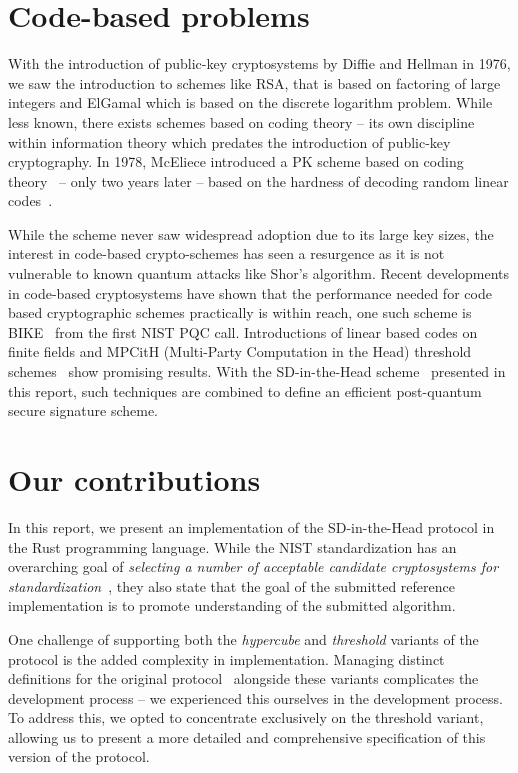 \documentclass[11pt]{report}
\theoremstyle{definition}
\theoremstyle{plain}
\begin{document}
\section{Code-based problems}

With the introduction of public-key cryptosystems by Diffie and Hellman in 1976, we saw the introduction to schemes like RSA, that is based on factoring of large integers and ElGamal which is based on the discrete logarithm problem. While less known, there exists schemes based on coding theory -- its own discipline within information theory which predates the introduction of public-key cryptography. In 1978, McEliece introduced a PK scheme based on coding theory~\cite{mceliece1978public} -- only two years later -- based on the hardness of decoding random linear codes~\cite{berlekamp1978inherent}.

While the scheme never saw widespread adoption due to its large key sizes, the interest in code-based crypto-schemes has seen a resurgence as it is not vulnerable to known quantum attacks like Shor's algorithm. Recent developments in code-based cryptosystems have shown that the performance needed for code based cryptographic schemes practically is within reach, one such scheme is BIKE~\cite{BIKE_Spec_2024} from the first NIST PQC call. Introductions of linear based codes on finite fields and MPCitH (Multi-Party Computation in the Head) threshold schemes~\cite{baum2020concretely} show promising results. With the SD-in-the-Head scheme~\cite{aguilarsyndrome11,feneuil2023threshold} presented in this report, such techniques are combined to define an efficient post-quantum secure signature scheme.

\section{Our contributions}

In this report, we present an implementation of the SD-in-the-Head protocol in the Rust programming language. While the NIST standardization has an overarching goal of \textit{selecting a number of acceptable candidate cryptosystems for standardization}~\cite{nistcall}, they also state that the goal of the submitted reference implementation is to promote understanding of the submitted algorithm.

One challenge of supporting both the \textit{hypercube} and \textit{threshold} variants of the protocol is the added complexity in implementation. Managing distinct definitions for the original protocol~\cite{feneuil2022syndrome} alongside these variants complicates the development process -- we experienced this ourselves in the development process. To address this, we opted to concentrate exclusively on the threshold variant, allowing us to present a more detailed and comprehensive specification of this version of the protocol.
\end{document}
